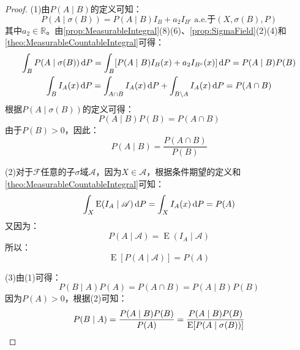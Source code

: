 \begin{proof}
	(1)由$P(A\mid B)$的定义可知：
	\begin{equation*}
		P(A\mid\sigma(B))=P(A\mid B)I_B+a_2I_{B^c}\;\text{a.e.于$(X,\sigma(B),P)$}
	\end{equation*}
	其中$a_2\in\mathbb{R}$。由\cref{prop:MeasurableIntegral}(8)(6)、\cref{prop:SigmaField}(2)(4)和\cref{theo:MeasurableCountableIntegral}可得：
	\begin{gather*}
		\int_{B}P(A\mid\sigma(B))\mathop{}\!\mathrm{d} P=\int_{B}[P(A\mid B)I_B(x)+a_2I_{B^c}(x)]\mathop{}\!\mathrm{d} P=P(A\mid B)P(B) \\
		\int_{B}I_A(x)\mathop{}\!\mathrm{d} P=\int_{A\cap B}I_A(x)\mathop{}\!\mathrm{d} P+\int_{B\backslash A}I_A(x)\mathop{}\!\mathrm{d} P=P(A\cap B)
	\end{gather*}
	根据$P(A\mid\sigma(B))$的定义可得：
	\begin{equation*}
		P(A\mid B)P(B)=P(A\cap B)
	\end{equation*}
	由于$P(B)>0$，因此：
	\begin{equation*}
		P(A\mid B)=\frac{P(A\cap B)}{P(B)}
	\end{equation*}\par
	(2)对于$\mathscr{F}$任意的子$\sigma$域$\mathscr{A}$，因为$X\in\mathscr{A}$，根据条件期望的定义和\cref{theo:MeasurableCountableIntegral}可知：
	\begin{equation*}
		\int_{X}\operatorname{E}(I_A\mid\mathscr{A})\mathop{}\!\mathrm{d} P=\int_{X}I_A(x)\mathop{}\!\mathrm{d} P=P(A)
	\end{equation*}
	又因为：
	\begin{equation*}
		P(A\mid\mathscr{A})=\operatorname{E}(I_A\mid\mathscr{A})
	\end{equation*}
	所以：
	\begin{equation*}
		\operatorname{E}[P(A\mid\mathscr{A})]=P(A)
	\end{equation*}\par
	(3)由(1)可得：
	\begin{equation*}
		P(B\mid A)P(A)=P(A\cap B)=P(A\mid B)P(B)
	\end{equation*}
	因为$P(A)>0$，根据(2)可知：
	\begin{equation*}
		P(B\mid A)=\frac{P(A\mid B)P(B)}{P(A)}=\frac{P(A\mid B)P(B)}{\operatorname{E}[P(A\mid\sigma(B))]}\qedhere
	\end{equation*}
\end{proof}
